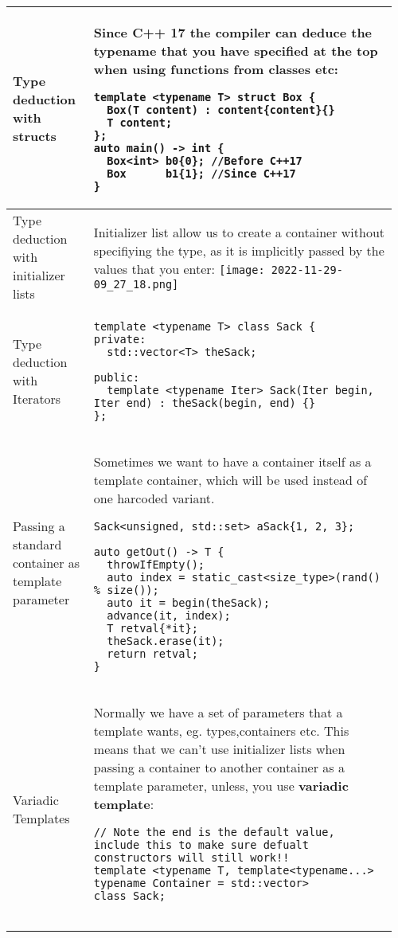 \documentclass[main.tex,fontsize=8pt,paper=a4,paper=portrait,DIV=calc]{scrartcl}
\begin{document}
\begin{table}[ht!]
\begin{tabular}{|m{0.2\linewidth}|m{0.755\linewidth}|}
\hline
Type deduction with structs & 
Since C++ 17 the compiler can deduce the typename that you have specified at the top when using functions from classes etc: \newline
\begin{lstlisting}
template <typename T> struct Box {
  Box(T content) : content{content}{}
  T content;
};
auto main() -> int {
  Box<int> b0{0}; //Before C++17
  Box      b1{1}; //Since C++17
}
\end{lstlisting} \\
\hline
Type deduction with initializer lists & 
Initializer list allow us to create a container without specifiying the type, as it is implicitly passed by the values that you enter:\newline
\texttt{[image: 2022-11-29-09\_27\_18.png]}\\
\hline
Type deduction with Iterators & 
\vspace{2mm}
\begin{lstlisting}
template <typename T> class Sack {
private:
  std::vector<T> theSack;

public:
  template <typename Iter> Sack(Iter begin, Iter end) : theSack(begin, end) {}
};
\end{lstlisting}\\
\hline
Passing a standard container as template parameter & 
Sometimes we want to have a container itself as a template container, which will be used instead of one harcoded variant.\newline
\begin{lstlisting}
Sack<unsigned, std::set> aSack{1, 2, 3};

auto getOut() -> T {
  throwIfEmpty();
  auto index = static_cast<size_type>(rand() % size());
  auto it = begin(theSack);
  advance(it, index);
  T retval{*it};
  theSack.erase(it);
  return retval;
}
\end{lstlisting}\\
\hline
Variadic Templates & 
Normally we have a set of parameters that a template wants, eg. types,containers etc. This means that we can't use initializer lists when passing a container to another container as a template parameter, unless, you use \textbf{variadic template}:\newline
\begin{lstlisting}
// Note the end is the default value, include this to make sure defualt constructors will still work!!
template <typename T, template<typename...> typename Container = std::vector>
class Sack;


\end{lstlisting}
\end{tabular}
\end{table}
\end{document}
